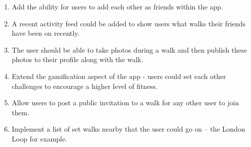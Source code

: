 \begin{enumerate}[label=\textbf{Ext \arabic*}]
  \item Add the ability for users to add each other as friends within the app.
  \item A recent activity feed could be added to show users what walks their friends have been on recently.
  \item The user should be able to take photos during a walk and then publish these photos to their profile along with the walk.
  \item Extend the gamification aspect of the app - users could set each other challenges to encourage a higher level of fitness.
  \item Allow users to post a public invitation to a walk for any other user to join them.
  \item Implement a list of set walks nearby that the user could go on -- the London Loop for example.
\end{enumerate}